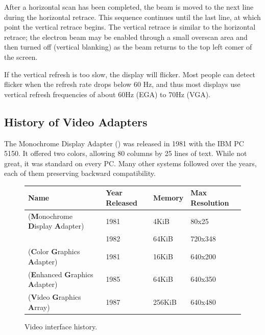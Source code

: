 \documentclass[book.tex]{subfiles}
\begin{document}
\par
After a horizontal scan has been completed, the beam is moved to the next
line during the horizontal retrace. This sequence continues until the last line, at which point the vertical retrace begins. The vertical retrace is similar to the horizontal retrace; the electron beam may be enabled through a small overscan area and then turned off (vertical blanking) as the beam returns to the top left comer of the screen.\\

\par
If the vertical refresh is too slow, the display will flicker. Most people can detect flicker when the refresh rate drops below 60 Hz, and thus most displays use vertical refresh frequencies of about 60Hz (EGA) to 70Hz (VGA). 



  \subsection{History of Video Adapters}

The Monochrome Display Adapter () was released in 1981 with the IBM PC 5150. It offered two colors, allowing 80 columns by 25 lines of text.  While not great, it was standard on every PC. Many other systems followed over the years, each of them preserving backward compatibility.

\bigskip
 \begin{figure}[H]
\centering  
\begin{tabularx}{\textwidth}{ l X l Y }
  \toprule
  \textbf{Name} &  \textbf{Year Released} & \textbf{Memory} & \textbf{Max Resolution}\\
  \toprule {}
   (\textbf{M}onochrome
   \textbf{D}isplay
   \textbf{A}dapter) & 1981 & 4KiB & 80x25\footnotemark 
   \\  & 1982 & 64KiB & 720x348
   \\ 
   (\textbf{C}olor
   \textbf{G}raphics
   \textbf{A}dapter) & 1981 & 16KiB & 640x200
    \\ 
   (\textbf{E}nhanced
   \textbf{G}raphics
   \textbf{A}dapter) & 1985 & 64KiB & 640x350
   \\ 
   (\textbf{V}ideo
   \textbf{G}raphics
   \textbf{A}rray)  & 1987 & 256KiB & 640x480
    \\
  \toprule
\end{tabularx}
\caption{Video interface history.}\label{fig:vga_history}
   
\end{figure}
\addtocounter{footnote}{-1}
\end{document}

